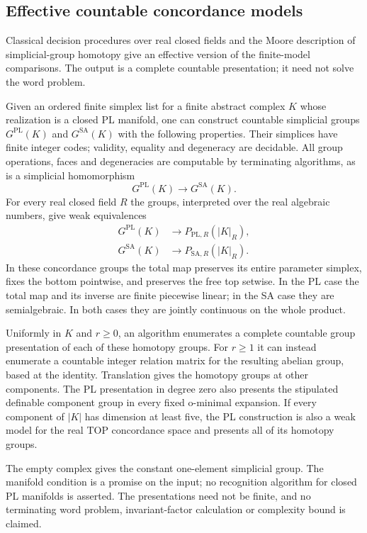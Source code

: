 \subsection{Effective countable concordance models}

Classical decision procedures over real closed fields and the Moore
description of simplicial-group homotopy give an effective version of
the finite-model comparisons.  The output is a complete countable
presentation; it need not solve the word problem.

\begin{theorem}\label{thm:effective-countable-concordance-models}
Given an ordered finite simplex list for a finite abstract complex $K$
whose realization is a closed PL manifold, one can construct countable
simplicial groups $G^{\mathrm{PL}}(K)$ and $G^{\mathrm{SA}}(K)$ with
the following properties.  Their simplices have finite integer codes;
validity, equality and degeneracy are decidable.  All group operations,
faces and degeneracies are computable by terminating algorithms, as
is a simplicial homomorphism
\[
                   G^{\mathrm{PL}}(K)\longrightarrow G^{\mathrm{SA}}(K).
\]
For every real closed field $R$ the groups, interpreted over the real
algebraic numbers, give weak equivalences
\[
 \begin{aligned}
 G^{\mathrm{PL}}(K)&\longrightarrow P_{\mathrm{PL},R}(|K|_R),\\
 G^{\mathrm{SA}}(K)&\longrightarrow P_{\mathrm{SA},R}(|K|_R).
 \end{aligned}
\]
In these concordance groups the total map preserves its entire
parameter simplex, fixes the bottom pointwise, and preserves the
free top setwise. In the PL case the total map and its inverse
are finite piecewise linear; in the SA case they are semialgebraic.
In both cases they are jointly continuous on the whole product.

Uniformly in $K$ and $r\geq0$, an algorithm enumerates a complete
countable group presentation of each of these homotopy groups.
For $r\geq1$ it can instead enumerate a countable integer relation
matrix for the resulting abelian group, based at the identity.
Translation gives the homotopy groups at other components.
The PL presentation in degree zero also presents the stipulated
definable component group in every fixed o-minimal expansion.
If every component of $|K|$ has dimension at least five, the PL
construction is also a weak model for the real TOP concordance
space and presents all of its homotopy groups.

The empty complex gives the constant one-element simplicial group.
The manifold condition is a promise on the input; no recognition
algorithm for closed PL manifolds is asserted.  The presentations
need not be finite, and no terminating word problem, invariant-factor
calculation or complexity bound is claimed.
\end{theorem}

